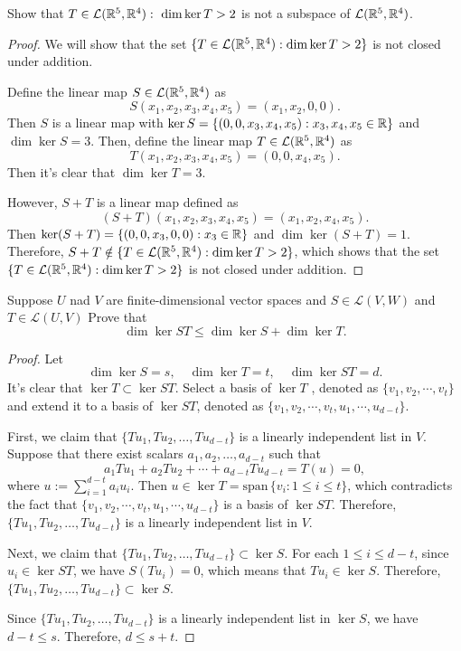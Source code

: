 \documentclass{article}
\newcommand{\sspan}{\text{span}\,}
\begin{document}
\begin{problem}[3B-4]
    Show that \( T\in \mathcal{L}(\R^5,\R^4):\ \dim\ker T>2 \) is not a subspace of \( \mathcal{L }(\mathbb{R}^5, \mathbb{R}^4) \). 
\end{problem}

\begin{proof}
    We will show that the set \( \{T \in \mathcal{L}(\mathbb{R}^5, \mathbb{R}^4) : \dim\ker T > 2\} \) is not closed under addition.\par
    Define the linear map \( S \in \mathcal{L}(\mathbb{R}^5, \mathbb{R}^4) \) as
    \[ S(x_1, x_2, x_3, x_4, x_5) = (x_1, x_2, 0, 0). \]
    Then \( S \) is a linear map with \( \ker S=\left\{(0,0,x_3,x_4,x_5):x_3,x_4,x_5\in\mathbb{R} \right\} \) and \( \dim\ker S=3 \). Then, define the linear map \( T \in \mathcal{L }(\mathbb{R}^5,\mathbb{R}^4) \) as
    \[ T(x_1,x_2,x_3,x_4,x_5) = (0,0,x_4,x_5). \] 
    Then it's clear that \( \dim\ker T =3. \) \par
    However, \( S+T \) is a linear map defined as
    \[ (S+T)(x_1,x_2,x_3,x_4,x_5) = (x_1, x_2, x_4, x_5). \]
    Then \( \ker(S+T) = \{(0, 0, x_3, 0, 0) : x_3 \in \mathbb{R}\} \) and \( \dim\ker(S+T) = 1 \). Therefore, \( S+T \notin \{T \in \mathcal{L}(\mathbb{R}^5, \mathbb{R}^4) : \dim\ker T > 2\} \), which shows that the set \( \{T \in \mathcal{L}(\mathbb{R}^5, \mathbb{R}^4) : \dim\ker T > 2\} \) is not closed under addition.
\end{proof}

\begin{problem}[3B-22]
    Suppose \( U \) nad \( V \) are finite-dimensional vector spaces and \( S\in \mathcal{L }(V,W) \) and \( T\in \mathcal{L }(U,V) \) Prove that 
    \[ \dim\ker ST\le\dim\ker S+\dim\ker T. \] 
\end{problem} 

\begin{proof}
    Let
    \[ \dim\ker S=s,\quad\dim\ker T=t,\quad\dim\ker ST=d. \] 
    It's clear that \( \ker T\subset \ker ST \). Select a basis of \( \ker T \) , denoted as \( \{v_1,v_2,\cdots,v_t\}  \) and extend it to a basis of \( \ker ST \), denoted as \( \{v_1,v_2,\cdots,v_t,u_1,\cdots,u_{d-t}\} \).\par
    First, we claim that \( \{Tu_1, Tu_2, \ldots, Tu_{d-t}\} \) is a linearly independent list in \( V \). Suppose that there exist scalars \( a_1, a_2, \ldots, a_{d-t} \) such that
    \[ a_1 Tu_1 + a_2 Tu_2 + \cdots + a_{d-t} Tu_{d-t} =T(u)= 0, \]
    where \( u:=\sum_{i=1}^{d-t} a_iu_i \). Then \( u\in\ker T=\sspan\{v_i:1\le i\le t\} \), which contradicts the fact that \( \{v_1,v_2,\cdots,v_t,u_1,\cdots,u_{d-t}\} \) is a basis of \( \ker ST \). Therefore, \( \{Tu_1, Tu_2, \ldots, Tu_{d-t}\} \) is a linearly independent list in \( V \). \par
    Next, we claim that \( \{Tu_1, Tu_2, \ldots, Tu_{d-t}\} \subset \ker S \). For each \( 1\le i\le d-t \), since \( u_i\in\ker ST \), we have \( S(Tu_i)=0 \), which means that \( Tu_i\in\ker S \). Therefore, \( \{Tu_1, Tu_2, \ldots, Tu_{d-t}\} \subset \ker S \). \par
    Since \( \{Tu_1, Tu_2, \ldots, Tu_{d-t}\} \) is a linearly independent list in \( \ker S \), we have \( d-t \le s \). Therefore, \( d \le s + t \).
\end{proof}
\end{document}
